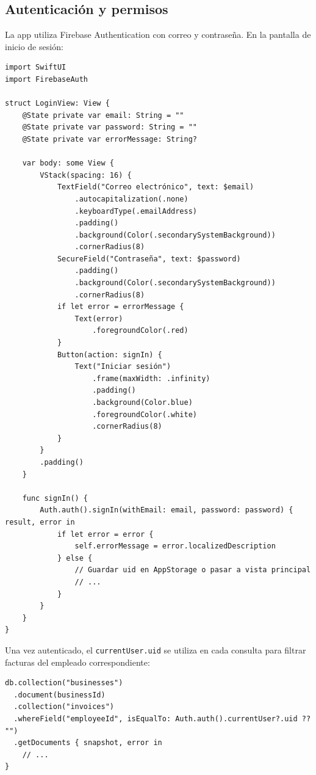 \subsection{Autenticación y permisos}

\begin{large}

La app utiliza Firebase Authentication con correo y contraseña. En la pantalla de inicio de sesión:

\begin{verbatim}
import SwiftUI
import FirebaseAuth

struct LoginView: View {
    @State private var email: String = ""
    @State private var password: String = ""
    @State private var errorMessage: String?

    var body: some View {
        VStack(spacing: 16) {
            TextField("Correo electrónico", text: $email)
                .autocapitalization(.none)
                .keyboardType(.emailAddress)
                .padding()
                .background(Color(.secondarySystemBackground))
                .cornerRadius(8)
            SecureField("Contraseña", text: $password)
                .padding()
                .background(Color(.secondarySystemBackground))
                .cornerRadius(8)
            if let error = errorMessage {
                Text(error)
                    .foregroundColor(.red)
            }
            Button(action: signIn) {
                Text("Iniciar sesión")
                    .frame(maxWidth: .infinity)
                    .padding()
                    .background(Color.blue)
                    .foregroundColor(.white)
                    .cornerRadius(8)
            }
        }
        .padding()
    }

    func signIn() {
        Auth.auth().signIn(withEmail: email, password: password) { result, error in
            if let error = error {
                self.errorMessage = error.localizedDescription
            } else {
                // Guardar uid en AppStorage o pasar a vista principal
                // ...
            }
        }
    }
}
\end{verbatim}

Una vez autenticado, el \texttt{currentUser.uid} se utiliza en cada consulta para filtrar facturas del empleado correspondiente:

\begin{verbatim}
db.collection("businesses")
  .document(businessId)
  .collection("invoices")
  .whereField("employeeId", isEqualTo: Auth.auth().currentUser?.uid ?? "")
  .getDocuments { snapshot, error in
    // ...
}
\end{verbatim}

\end{large}

